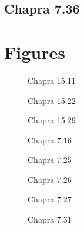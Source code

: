 \documentclass{article}
\begin{document}
\subsection{Chapra 7.36}
\pagebreak

\section{Figures}
\begin{figure}[h!]
\begin{center}
\caption{Chapra 15.11}
\end{center}
\end{figure}

\begin{figure}[h!]
\begin{center}
\caption{Chapra 15.22}
\end{center}
\end{figure}

\begin{figure}[h!]
\begin{center}
\caption{Chapra 15.29}
\end{center}
\end{figure}
 
\begin{figure}[h!]
\begin{center}
\caption{Chapra 7.16}
\end{center}
\end{figure}
 
\begin{figure}[h!]
\begin{center}
\caption{Chapra 7.25}
\end{center}
\end{figure}
 
\begin{figure}[h!]
\begin{center}
\caption{Chapra 7.26}
\end{center}
\end{figure}
 
\begin{figure}[h!]
\begin{center}
\caption{Chapra 7.27}
\end{center}
\end{figure}
 
\begin{figure}[h!]
\begin{center}
\caption{Chapra 7.31}
\end{center}
\end{figure}
\end{document}
